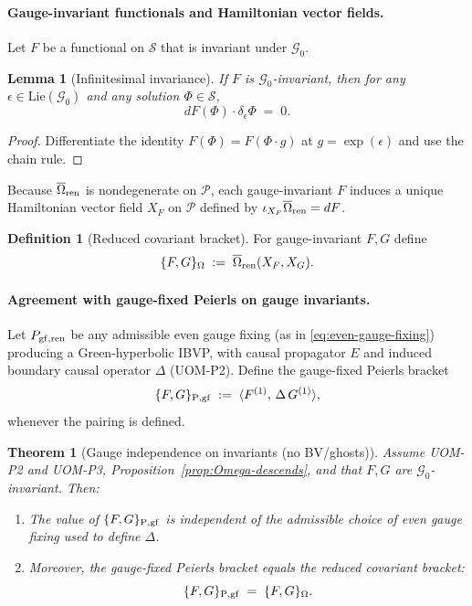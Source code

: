 \documentclass[10pt]{article}
\theoremstyle{definition}
\newtheorem{definition}{Definition}[section]
\theoremstyle{plain}
\newtheorem{theorem}{Theorem}[section]
\newtheorem{lemma}{Lemma}[section]
\begin{document}
\paragraph{Gauge-invariant functionals and Hamiltonian vector fields.}
Let $F$ be a functional on $\mathcal S$ that is invariant under $\mathcal G_0$.

\begin{lemma}[Infinitesimal invariance]
\label{lem:inf-inv}
If $F$ is $\mathcal G_0$-invariant, then for any $\epsilon\in \mathrm{Lie}(\mathcal G_0)$ and any solution $\Phi\in\mathcal S$,
\[
dF(\Phi)\cdot \delta_\epsilon\Phi\;=\;0.
\]
\end{lemma}

\begin{proof}
Differentiate the identity $F(\Phi)=F(\Phi\cdot g)$ at $g=\exp(\epsilon)$ and use the chain rule.
\end{proof}

Because $\overline\Omega_{\rm ren}$ is nondegenerate on $\mathcal P$, each gauge-invariant $F$ induces a unique Hamiltonian vector field
$X_F$ on $\mathcal P$ defined by $\iota_{X_F}\overline\Omega_{\rm ren}=dF$.

\begin{definition}[Reduced covariant bracket]
\label{def:reduced-bracket}
For gauge-invariant $F,G$ define
\[
\{F,G\}_\Omega \;:=\;\overline\Omega_{\rm ren}(X_F,X_G).
\]
\end{definition}

\paragraph{Agreement with gauge-fixed Peierls on gauge invariants.}
Let $P_{\rm gf,ren}$ be any admissible even gauge fixing (as in \eqref{eq:even-gauge-fixing}) producing a Green-hyperbolic IBVP, with causal
propagator $E$ and induced boundary causal operator $\Delta$ (UOM-P2).  Define the gauge-fixed Peierls bracket
\[
\{F,G\}_{{\rm P},{\rm gf}}\;:=\;\langle F^{(1)},\,\Delta\,G^{(1)}\rangle,
\]
whenever the pairing is defined.

\begin{theorem}[Gauge independence on invariants (no BV/ghosts)]
\label{thm:gauge-independence}
Assume UOM-P2 and UOM-P3, Proposition~\ref{prop:Omega-descends}, and that $F,G$ are $\mathcal G_0$-invariant.
Then:
\begin{enumerate}[label=\textnormal{(\roman*)},leftmargin=2.0em,itemsep=1pt]
\item The value of $\{F,G\}_{{\rm P},{\rm gf}}$ is independent of the admissible choice of even gauge fixing used to define $\Delta$.
\item Moreover, the gauge-fixed Peierls bracket equals the reduced covariant bracket:
\[
\{F,G\}_{{\rm P},{\rm gf}} \;=\; \{F,G\}_\Omega.
\]
\end{enumerate}
\end{theorem}
\end{document}
